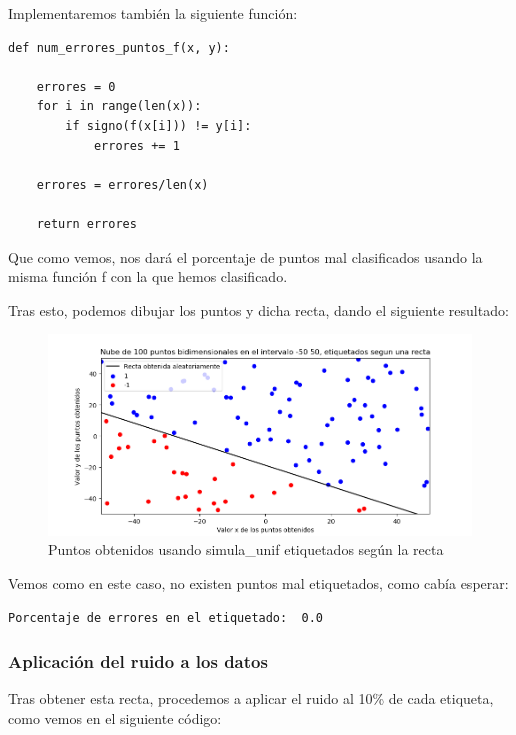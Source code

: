\documentclass[12pt, spanish]{article}
\begin{document}
Implementaremos también la siguiente función:

\begin{lstlisting}
def num_errores_puntos_f(x, y):

	errores = 0
	for i in range(len(x)):
		if signo(f(x[i])) != y[i]:
			errores += 1

	errores = errores/len(x)

	return errores
\end{lstlisting}

Que como vemos, nos dará el porcentaje de puntos mal clasificados usando la misma función f con la que hemos clasificado.


Tras esto, podemos dibujar los puntos y dicha recta, dando el siguiente resultado:

\begin{figure}[H]
  \centering
      \includegraphics[scale = 0.70]{ej1-2-1.png}
 		 \caption{Puntos obtenidos usando simula\_unif etiquetados según la recta}
  		\label{fig:ej1-2-1}

\end{figure}


Vemos como en este caso, no existen puntos mal etiquetados, como cabía esperar:

\begin{lstlisting}
Porcentaje de errores en el etiquetado:  0.0
\end{lstlisting}

\newpage

\subsubsection{Aplicación del ruido a los datos}

Tras obtener esta recta, procedemos a aplicar el ruido al 10\% de cada etiqueta, como vemos en el siguiente código:
\end{document}
